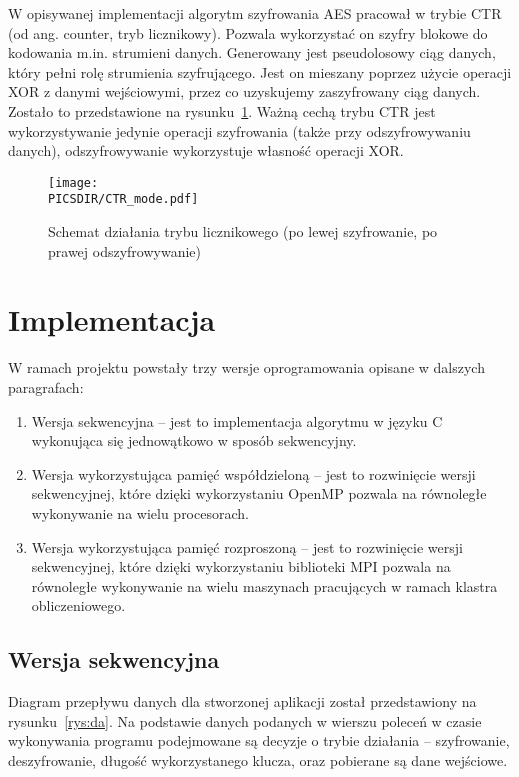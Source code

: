 \documentclass[a4paper,12pt]{article}
\def\PICSDIR{PICS}
\begin{document}
W opisywanej implementacji algorytm szyfrowania AES pracował w trybie CTR (od ang. counter, tryb licznikowy). Pozwala wykorzystać on szyfry blokowe do kodowania m.in. strumieni danych. Generowany jest pseudolosowy ciąg danych, który pełni rolę strumienia szyfrującego. Jest on mieszany poprzez użycie operacji XOR z danymi wejściowymi, przez co uzyskujemy zaszyfrowany ciąg danych. Zostało to przedstawione na rysunku~\ref{rys:ctr}. Ważną cechą trybu CTR jest wykorzystywanie jedynie operacji szyfrowania (także przy odszyfrowywaniu danych), odszyfrowywanie wykorzystuje własność operacji XOR.

\begin{figure}
\centering
\texttt{[image: \\PICSDIR/CTR\_mode.pdf]}
\caption{Schemat działania trybu licznikowego (po lewej szyfrowanie, po prawej odszyfrowywanie)}
\label{rys:ctr}
\end{figure}

\section{Implementacja}
W ramach projektu powstały trzy wersje oprogramowania opisane w dalszych paragrafach:
\begin{enumerate}
\item Wersja sekwencyjna -- jest to implementacja algorytmu w języku C wykonująca się jednowątkowo w sposób sekwencyjny.
\item Wersja wykorzystująca pamięć współdzieloną -- jest to rozwinięcie wersji sekwencyjnej, które dzięki wykorzystaniu OpenMP pozwala na równoległe wykonywanie na wielu procesorach.
\item Wersja wykorzystująca pamięć rozproszoną -- jest to rozwinięcie wersji sekwencyjnej, które dzięki wykorzystaniu biblioteki MPI pozwala na równoległe wykonywanie na wielu maszynach pracujących w ramach klastra obliczeniowego.
\end{enumerate}



\subsection{Wersja sekwencyjna}

Diagram przepływu danych dla stworzonej aplikacji został przedstawiony na rysunku~\ref{rys:da}.  Na podstawie danych podanych w wierszu poleceń w czasie wykonywania programu podejmowane są decyzje o trybie działania -- szyfrowanie, deszyfrowanie, długość wykorzystanego klucza, oraz pobierane są dane wejściowe.
\end{document}
